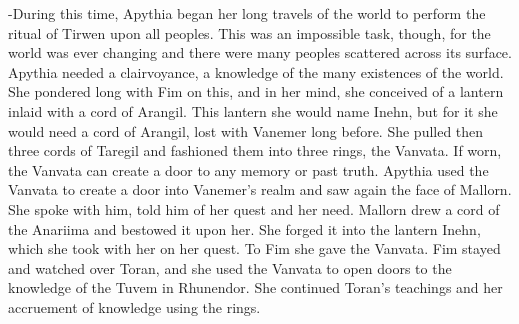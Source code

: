 \documentclass[smalldemyvopaper,11pt,twoside,onecolumn,openright,extrafontsizes]{memoir}
\begin{document}
{{-During this time, Apythia began her long travels of the world to perform the ritual of Tirwen upon all peoples. This was an impossible task, though, for the world was ever changing and there were many peoples scattered across its surface. Apythia needed a clairvoyance, a knowledge of the many existences of the world. She pondered long with Fim on this, and in her mind, she conceived of a lantern inlaid with a cord of Arangil. This lantern she would name Inehn, but for it she would need a cord of Arangil, lost with Vanemer long before. She pulled then three cords of Taregil and fashioned them into three rings, the Vanvata. If worn, the Vanvata can create a door to any memory or past truth. Apythia used the Vanvata to create a door into Vanemer’s realm and saw again the face of Mallorn. She spoke with him, told him of her quest and her need. Mallorn drew a cord of the Anariima and bestowed it upon her. She forged it into the lantern Inehn, which she took with her on her quest. To Fim she gave the Vanvata. Fim stayed and watched over Toran, and she used the Vanvata to open doors to the knowledge of the Tuvem in Rhunendor. She continued Toran’s teachings and her accruement of knowledge using the rings.

}}
\end{document}
